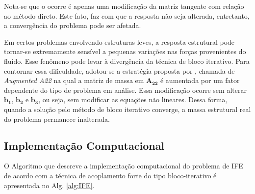 \documentclass[tese_patricia]{subfiles}
\begin{document}
Nota-se que o ocorre é apenas uma modificação da matriz tangente com relação ao método direto. Este fato, faz com que a resposta não seja alterada, entretanto, a convergência do problema pode ser afetada. 

Em certos problemas envolvendo estruturas leves, a resposta estrutural pode tornar-se extremamente sensível a pequenas variações nas forças provenientes do fluido. Esse fenômeno pode levar à divergência da técnica de bloco iterativo. Para contornar essa dificuldade, adotou-se a estratégia proposta por , chamada de \textit{Augmented A22} na qual a matriz de massa em $\mathbf{A_{22}}$ é aumentada por um fator dependente do tipo de problema em análise. Essa modificação ocorre sem alterar $\mathbf{b_{1}}$, $\mathbf{b_{2}}$ e $\mathbf{b_{3}}$, ou seja, sem modificar as equações não lineares. Dessa forma, quando a solução pelo método de bloco iterativo converge, a massa estrutural real do problema permanece inalterada.

\subsection{Implementação Computacional} 


O Algoritmo que descreve a implementação computacional do problema de IFE de acordo com a técnica de acoplamento forte do tipo bloco-iterativo é apresentada no Alg. \ref{alg:IFE}.
\end{document}
